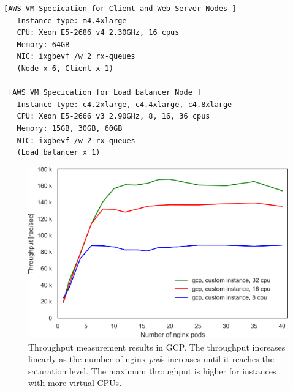 \begin{table}[h]

  \centering
  \begin{minipage}{0.9\columnwidth}
    \begin{lstlisting}[frame=lines,breaklines=true,basicstyle=\small\ttfamily]
 [AWS VM Specication for Client and Web Server Nodes ]
   Instance type: m4.4xlarge
   CPU: Xeon E5-2686 v4 2.30GHz, 16 cpus
   Memory: 64GB
   NIC: ixgbevf /w 2 rx-queues
   (Node x 6, Client x 1)

 [AWS VM Specication for Load balancer Node ]
   Instance type: c4.2xlarge, c4.4xlarge, c4.8xlarge
   CPU: Xeon E5-2666 v3 2.90GHz, 8, 16, 36 cpus
   Memory: 15GB, 30GB, 60GB
   NIC: ixgbevf /w 2 rx-queues
   (Load balancer x 1)
    \end{lstlisting}
  \end{minipage}

  \par\bigskip
  \centering
  \begin{minipage}{0.9\columnwidth}
    \caption[Virtual Machine specifications in AWS experiment]{
Virtual Machine specifications in AWS experiment.
The author measured throughputs using load balancer nodes with 8 CPUs, 16 CPUs, and 36 CPUs.
Since there are only two rx-queues, the setting with \enquote{(rss, rps) = (off, on)} is used.
    }
    \label{fig:aws_machine_spec}
  \end{minipage}
\end{table}

\begin{figure}[h]
  \centering
  \includegraphics[width=0.75\columnwidth]{Figs/gcp_all_tp}
  \par\bigskip
  \centering
  \begin{minipage}{0.9\columnwidth}
    \caption[Throughput measurement results in GCP]{
Throughput measurement results in GCP.
The throughput increases linearly as the number of nginx {\em pod}s increases until it reaches the saturation level.
The maximum throughput is higher for instances with more virtual CPUs.
    }
    \label{fig:gcp_all_tp}
  \end{minipage}
\end{figure}


